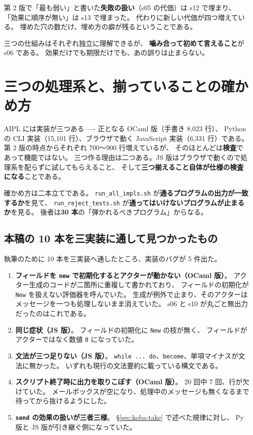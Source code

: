 \documentclass[11pt,a4paper]{ltjsarticle}
\theoremstyle{definition}
\theoremstyle{remark}
\begin{document}
第 2 版で「最も弱い」と書いた\textbf{失敗の扱い}（s05 の代価）は s12 で埋まり、
「効果に順序が無い」は s13 で埋まった。
代わりに新しい代価が四つ増えている。
埋めた穴の数だけ、埋め方の癖が残るということである。

三つの仕組みはそれぞれ独立に理解できるが、
\textbf{噛み合って初めて言えること}が s06 である。
効果だけでも期限だけでも、あの誤りは止まらない。

\section{三つの処理系と、揃っていることの確かめ方}
\label{sec:impl}

AIPL には実装が三つある ---- 正となる OCaml 版（手書き 8,023 行）、
Python の CLI 実装（15,101 行）、ブラウザで動く JavaScript 実装（6,331 行）である。
第 2 版の時点からそれぞれ 700〜900 行増えているが、
そのほとんどは\textbf{検査}であって機能ではない。
三つ作る理由は二つある。JS 版はブラウザで動くので処理系を配らずに試してもらえること、
そして\textbf{三つ揃えること自体が仕様の検査になる}ことである。

確かめ方は二本立てである。
\texttt{run\_all\_impls.sh} が\textbf{通るプログラムの出力が一致するか}を見て、
\texttt{run\_reject\_tests.sh} が\textbf{通ってはいけないプログラムが止まるか}を見る。
後者は\textbf{30 本}の「弾かれるべきプログラム」からなる。

\subsection{本稿の 10 本を三実装に通して見つかったもの}

執筆のために 10 本を三実装へ通したところ、実装のバグが 5 件出た。

\begin{enumerate}
\item \textbf{フィールドを \texttt{new} で初期化するとアクターが動かない（OCaml 版）}。
      アクター生成のコードが二箇所に重複して書かれており、
      フィールドの初期化が \texttt{New} を扱えない評価器を呼んでいた。
      生成が例外で止まり、そのアクターはメッセージを一つも処理しないまま消えていた。
      s06 と s10 が丸ごと無出力だったのはこれである。
\item \textbf{同じ症状（JS 版）}。
      フィールドの初期化に \texttt{New} の枝が無く、
      フィールドがアクターではなく数値 \texttt{0} になっていた。
\item \textbf{文法が三つ足りない（JS 版）}。
      \texttt{while ... do}、\texttt{become}、単項マイナスが文法に無かった。
      いずれも現行の文法要約に載っている構文である。
\item \textbf{スクリプト終了時に出力を取りこぼす（OCaml 版）}。
      20 回中 7 回、行が欠けていた。
      メールボックスが空になり、処理中のメッセージも無くなるまで待ってから抜けるようにした。
\item \textbf{\texttt{send} の効果の扱いが三者三様}。
      \S\ref{sec:koba-take} で述べた規律に対し、
      Py 版と JS 版が引き継ぐ側になっていた。
\end{enumerate}
\end{document}
